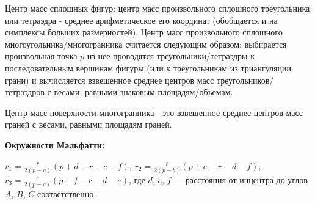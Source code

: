 Центр масс сплошных фигур: центр масс произвольного сплошного треугольника или тетраэдра - среднее арифметическое его координат (обобщается и на симплексы больших размерностей).
Центр масс произвольного сплошного многоугольника/многогранника считается следующим образом: выбирается произвольная точка $p$
из нее проводятся треугольники/тетраэдры к последовательным вершинам фигуры (или к треугольникам из триангуляции грани)
и вычисляется взвешенное среднее центров масс треугольников/тетраэдров с весами, равными знаковым площадям/объемам.

Центр масс поверхности многогранника - это взвешенное среднее центров масс граней с весами, равными площадям граней.

\textbf{Окружности Мальфатти:}

$r_1=\frac{r}{2(p-a)}(p+d-r-e-f)$, $r_2=\frac{r}{2(p-b)}(p+e-r-d-f)$, $r_3=\frac{r}{2(p-c)}(p+f-r-d-e)$, где $d$, $e$, $f$ --- расстояния от инцентра до углов $A$, $B$, $C$ соответственно

